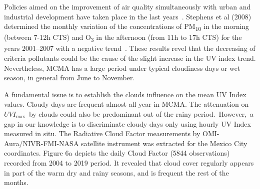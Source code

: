 \documentclass{article}
\begin{document}
Policies aimed on the improvement of air quality simultaneously with
urban and industrial development have taken place in the last
years~\cite{figueroa2009}. Stephens et al (2008) determined the monthly
variation of the concentrations of PM\textsubscript{10} in the morning
(between 7-12h CTS) and O\textsubscript{3} in the afternoon (from 11h to
17h CTS) for the years 2001--2007 with a negative
trend~\cite{Stephens_2008}. These results revel that the decreasing of
criteria pollutants could be the cause of the slight increase in the UV
index trend. Nevertheless, MCMA has a large period under typical
cloudiness days or wet season, in general from June to November.

A fundamental issue is to establish   the clouds influence on the mean UV
Index values. C{loudy days are frequent almost all year in MCMA. The
attenuation on~\(UVI_{\max}\)~by clouds could also be predominant
out of the rainy period.~However,~a gap in our knowledge is to
discriminate cloudy days only using hourly UV Index measured in situ.
T}he Radiative Cloud Factor measurements by OMI-Aura/NIVR-FMI-NASA
satellite instrument was extracted for the Mexico City coordinates.
Figure 6a %
depicts the daily Cloud Factor
(5844 observations) recorded from 2004 to 2019 period. It revealed that
cloud cover regularly appears in part of the warm dry and rainy seasons,
and is frequent the rest of the months.~
\end{document}
